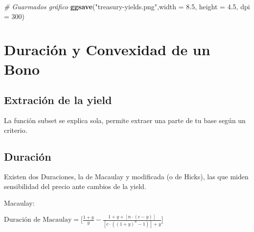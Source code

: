 \documentclass[12pt,]{book}
\newenvironment{Shaded}{\begin{snugshade}}{\end{snugshade}}
\newcommand{\KeywordTok}[1]{\textcolor[rgb]{0.13,0.29,0.53}{\textbf{#1}}}
\newcommand{\DataTypeTok}[1]{\textcolor[rgb]{0.13,0.29,0.53}{#1}}
\newcommand{\DecValTok}[1]{\textcolor[rgb]{0.00,0.00,0.81}{#1}}
\newcommand{\FloatTok}[1]{\textcolor[rgb]{0.00,0.00,0.81}{#1}}
\newcommand{\StringTok}[1]{\textcolor[rgb]{0.31,0.60,0.02}{#1}}
\newcommand{\CommentTok}[1]{\textcolor[rgb]{0.56,0.35,0.01}{\textit{#1}}}
\newcommand{\OperatorTok}[1]{\textcolor[rgb]{0.81,0.36,0.00}{\textbf{#1}}}
\newcommand{\NormalTok}[1]{#1}
\begin{document}
\begin{Shaded}
\begin{Highlighting}[]
\CommentTok{# Guarmados gráfico}
\KeywordTok{ggsave}\NormalTok{(}\StringTok{"treasury-yields.png"}\NormalTok{,}\DataTypeTok{width =} \FloatTok{8.5}\NormalTok{, }\DataTypeTok{height =} \FloatTok{4.5}\NormalTok{, }\DataTypeTok{dpi =} \DecValTok{300}\NormalTok{)}
\end{Highlighting}
\end{Shaded}

\section{Duración y Convexidad de un
Bono}\label{duracion-y-convexidad-de-un-bono}

\subsection{Extración de la yield}\label{extracion-de-la-yield}

La función subset se explica sola, permite extraer una parte de tu base
según un criterio.

\begin{Shaded}
\end{Shaded}

\subsection{Duración}\label{duracion}

Existen dos Duraciones, la de Macaulay y modificada (o de Hicks), las
que miden sensibilidad del precio ante cambios de la yield.

Macaulay:

\begin{center}

$\text{Duración de Macaulay} =\bigg[ \frac{1 + y}{y} - \frac{1+y + [n \cdot (c - y)]}{[ c\cdot((1+y)^n - 1)]+y} \bigg]$

\end{center}
\end{document}
